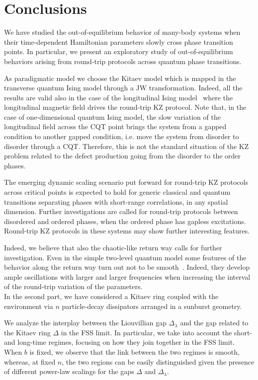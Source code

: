 \chapter{Conclusions}

We have studied the out-of-equilibrium behavior of
many-body systems when their time-dependent Hamiltonian parameters 
slowly cross phase transition points. In particular,  we present an exploratory study of 
out-of-equilibrium behaviors arising from round-trip protocols across quantum
phase transitions.

As paradigmatic model we choose the Kitaev model which is mapped in the transverse quantum
Ising model through a JW transformation. Indeed, all the results are valid also in the
case of the longitudinal Ising model~\cite{tarantelli2022out} where the longitudinal 
magnetic field drives the round-trip KZ protocol. Note that, in the case of one-dimensional
quantum Ising model, the slow variation of the longitudinal field across the CQT point 
brings the system from a gapped condition to another gapped condition, i.e. move the system
from disorder to disorder through a CQT. Therefore, this is not the standard situation of
the KZ problem related to the defect production going from the disorder 
to the order phases.

The emerging dynamic scaling scenario put forward
for round-trip KZ protocols across critical points is expected to hold for generic 
classical and quantum transitions separating phases with short-range correlations, in
any spatial dimension. Further investigations are called
for round-trip protocols between disordered and ordered
phases, when the ordered phase has gapless excitations.
Round-trip KZ protocols in these systems may show further interesting features.

Indeed, we believe that also the chaotic-like return way calls for further investigation.
Even in the simple two-level quantum model some features of the behavior along the
return way turn out not to be smooth~\cite{tarantelli2022out, tarantelli2023out}.
Indeed, they develop ample oscillations with larger and larger frequencies
when increasing the interval of the round-trip variation of the parameters.\\


In the second part, we have considered a Kitaev ring coupled with the environment via $n$ particle-decay dissipators arranged in a sunburst geometry.

We analyze the interplay between the Liouvillian gap $\Delta_\lambda$ and the gap related to the Kitaev ring $\Delta$ in the FSS limit. In particular, we take into account the short- and long-time regimes, focusing on how they join together in the FSS limit. When $b$ is fixed, we observe that the link between the two regimes is smooth, whereas, at fixed $n$, the two regions can be easily distinguished given the presence of different power-law scalings for the gaps $\Delta$ and $\Delta_\lambda$.\\


